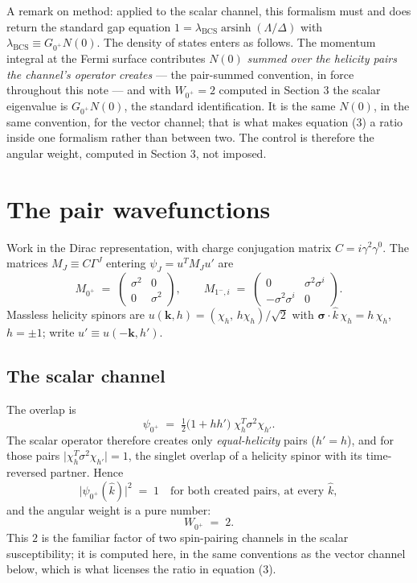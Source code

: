 \documentclass[11pt]{article}
\begin{document}
A remark on method: applied to the scalar channel, this formalism must and does return the standard gap equation $1 = \lambda_{\mathrm{BCS}} \operatorname{arsinh}(\Lambda/\Delta)$ with $\lambda_{\mathrm{BCS}} \equiv G_{0^+} N(0)$. The density of states enters as follows. The momentum integral at the Fermi surface contributes $N(0)$ \emph{summed over the helicity pairs the channel's operator creates} --- the pair-summed convention, in force throughout this note --- and with $W_{0^+} = 2$ computed in Section 3 the scalar eigenvalue is $G_{0^+} N(0)$, the standard identification. It is the same $N(0)$, in the same convention, for the vector channel; that is what makes equation (3) a ratio inside one formalism rather than between two. The control is therefore the angular weight, computed in Section 3, not imposed.

\section{The pair wavefunctions}

Work in the Dirac representation, with charge conjugation matrix $C = i\gamma^2\gamma^0$. The matrices $M_J \equiv C\Gamma^J$ entering $\psi_J = u^T M_J u'$ are
\begin{equation}
M_{0^+} \;=\; \begin{pmatrix} \sigma^2 & 0 \\ 0 & \sigma^2 \end{pmatrix},
\qquad
M_{1^-,i} \;=\; \begin{pmatrix} 0 & \sigma^2 \sigma^i \\ -\sigma^2 \sigma^i & 0 \end{pmatrix}.
\end{equation}
Massless helicity spinors are $u(\mathbf{k}, h) = (\chi_h,\, h\chi_h)/\sqrt{2}$ with $\boldsymbol{\sigma}\cdot\hat k\, \chi_h = h\, \chi_h$, $h = \pm 1$; write $u' \equiv u(-\mathbf{k}, h')$.

\subsection{The scalar channel}

The overlap is
\begin{equation}
\psi_{0^+} \;=\; \tfrac{1}{2}\big(1 + h h'\big)\; \chi_h^{T} \sigma^2 \chi_{h'} .
\end{equation}
The scalar operator therefore creates only \emph{equal-helicity} pairs ($h' = h$), and for those pairs $\big|\chi_h^T \sigma^2 \chi_{h'}\big| = 1$, the singlet overlap of a helicity spinor with its time-reversed partner. Hence
\begin{equation}
\big| \psi_{0^+}(\hat k) \big|^2 \;=\; 1 \quad \text{for both created pairs, at every } \hat k,
\end{equation}
and the angular weight is a pure number:
\begin{equation}
W_{0^+} \;=\; 2.
\end{equation}
This $2$ is the familiar factor of two spin-pairing channels in the scalar susceptibility; it is computed here, in the same conventions as the vector channel below, which is what licenses the ratio in equation (3).
\end{document}
